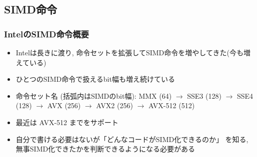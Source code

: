 \documentclass[10pt,dvipdfmx]{beamer}
\newcommand{\ao}[1]{{\color{blue}#1}}
\begin{document}
\subsection{SIMD命令}

\begin{frame}
  \frametitle{IntelのSIMD命令概要}
  \begin{itemize}
  \item Intelは長きに渡り, 命令セットを拡張してSIMD命令を増やしてきた(今も増えている)
  \item ひとつのSIMD命令で扱えるbit幅も増え続けている
  \item 命令セット名 (括弧内はSIMDのbit幅):
    \ao{MMX} (64) $\rightarrow$ \ao{SSE3} (128) $\rightarrow$ \ao{SSE4} (128)
    $\rightarrow$ \ao{AVX} (256)
    $\rightarrow$ \ao{AVX2} (256)
    $\rightarrow$ \ao{AVX-512} (512)
\iffalse
  \item ReedbushのCPUは Broadwell というマイクロアーキテクチャで \ao{AVX2}
    までをサポート
\fi
\item 最近は \ao{AVX-512} までをサポート
    
  \item 自分で書ける必要はないが「どんなコードがSIMD化できるのか」
    を知る, 無事SIMD化できたかを判断できるようになる必要がある
  \end{itemize}
  
\end{frame}
\end{document}
